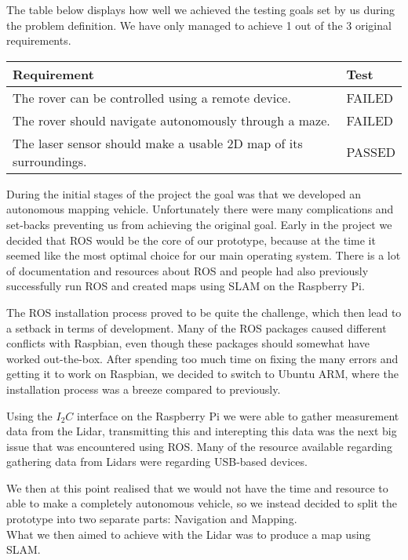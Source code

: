 The table below displays how well we achieved the testing goals set by us during the problem definition. We have only managed to achieve 1 out of the 3 original requirements.

\begin{table}[H]
	\centering
	\begin{tabular}{|l|l|}
		\hline
		\textbf{Requirement} & \textbf{Test} \\ \hline
		The rover can be controlled using a remote device. & FAILED \\ \hline
		The rover should navigate autonomously through a maze. & FAILED \\ \hline
		The laser sensor should make a usable 2D map of its surroundings. & PASSED\\ \hline
	\end{tabular}
\end{table}

During the initial stages of the project the goal was that we developed an autonomous mapping vehicle. Unfortunately there were many complications and set-backs preventing us from achieving the original goal. 
Early in the project we decided that ROS would be the core of our prototype, because at the time it seemed like the most optimal choice for our main operating system. There is a lot of documentation and resources about ROS and people had also previously successfully run ROS and created maps using SLAM on the Raspberry Pi.

The ROS installation process proved to be quite the challenge, which then lead to a setback in terms of development. Many of the ROS packages caused different conflicts with Raspbian, even though these packages should somewhat have worked out-the-box. After spending too much time on fixing the many errors and getting it to work on Raspbian, we decided to switch to Ubuntu ARM, where the installation process was a breeze compared to previously.

Using the $I_2C$ interface on the Raspberry Pi we were able to gather measurement data from the Lidar, transmitting this and interepting this data was the next big issue that was encountered using ROS. Many of the resource available regarding gathering data from Lidars were regarding USB-based devices. %


We then at this point realised that we would not have the time and resource to able to make a completely autonomous vehicle, so we instead decided to split the prototype into two separate parts: Navigation and Mapping.\\
What we then aimed to achieve with the Lidar was to produce a map using SLAM. %

